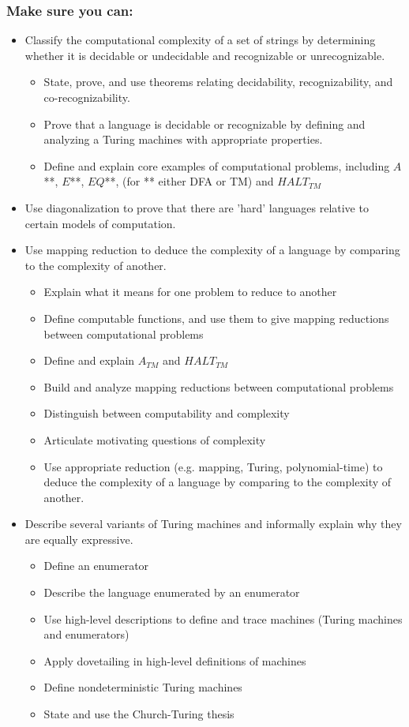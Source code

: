 \documentclass[12pt, oneside]{article}
\begin{document}
\subsubsection*{Make sure you can:}
\begin{itemize}
\item Classify the computational complexity of a set of strings by determining whether it is decidable or undecidable and recognizable or unrecognizable.
\begin{itemize}
   \item State, prove, and use theorems relating decidability, recognizability, and co-recognizability.
   \item Prove that a language is decidable or recognizable by defining and analyzing a Turing machines with appropriate properties.
   \item Define and explain core examples of computational problems, including $A$**, $E$**, $EQ$**, (for ** either DFA or TM) and $HALT_{TM}$
\end{itemize}
\item Use diagonalization to prove that there are 'hard' languages relative to certain models of computation.
\item Use mapping reduction to deduce the complexity of a language by comparing to the complexity of another.
   \begin{itemize}
      \item Explain what it means for one problem to reduce to another
      \item Define computable functions, and use them to give mapping reductions between computational problems
      \item Define and explain $A_{TM}$ and $HALT_{TM}$
      \item Build and analyze mapping reductions between computational problems
      \item Distinguish between computability and complexity
      \item Articulate motivating questions of complexity
      \item Use appropriate reduction (e.g. mapping, Turing, polynomial-time) to deduce the complexity of a language by comparing to the complexity of another.
   \end{itemize}
\item  Describe several variants of Turing machines and informally explain why they are equally expressive.
   \begin{itemize}
   \item Define an enumerator
   \item Describe the language enumerated by an enumerator
   \item Use high-level descriptions to define and trace machines (Turing machines and enumerators)
   \item Apply dovetailing in high-level definitions of machines
   \item Define nondeterministic Turing machines
   \item State and use the Church-Turing thesis
   \end{itemize}
\end{itemize}
\end{document}
